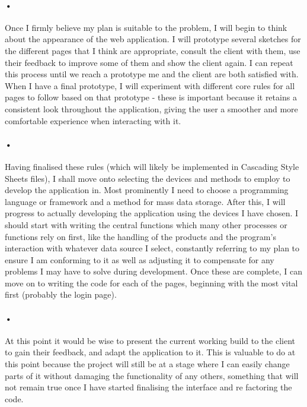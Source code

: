 ﻿\documentclass{article}
\begin{document}
    \paragraph{•}
    Once I firmly believe my plan is suitable to the problem, I will begin to think about the appearance of the web application.
    I will prototype several sketches for the different pages that I think are appropriate, consult the client with them, use their feedback to improve some of them and show the client again.
    I can repeat this process until we reach a prototype me and the client are both satisfied with.
    When I have a final prototype, I will experiment with different core rules for all pages to follow based on that prototype - these is important because it retains a consistent look throughout the application, giving the user a smoother and more comfortable experience when interacting with it.
    \paragraph{•}
    Having finalised these rules (which will likely be implemented in Cascading Style Sheets files), I shall move onto selecting the devices and methods to employ to develop the application in.
    Most prominently I need to choose a programming language or framework and a method for mass data storage.
    After this, I will progress to actually developing the application using the devices I have chosen.
    I should start with writing the central functions which many other processes or functions rely on first, like the handling of the products and the program's interaction with whatever data source I select, constantly referring to my plan to ensure I am conforming to it as well as adjusting it to compensate for any problems I may have to solve during development.
    Once these are complete, I can move on to writing the code for each of the pages, beginning with the most vital first (probably the login page).
    \paragraph{•}
    At this point it would be wise to present the current working build to the client to gain their feedback, and adapt the application to it.
    This is valuable to do at this point because the project will still be at a stage where I can easily change parts of it without damaging the functionality of any others, something that will not remain true once I have started finalising the interface and re factoring the code.
\end{document}
